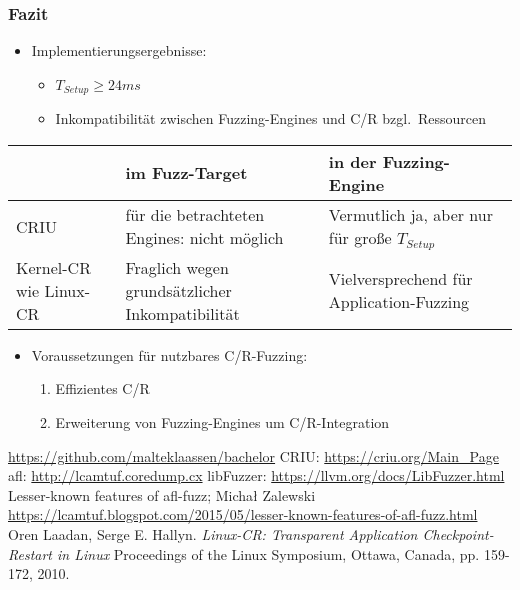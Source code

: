 \documentclass[handout]{beamer}
\begin{document}
\begin{frame}
    \frametitle{Fazit}
    \begin{itemize}
        \item Implementierungsergebnisse:
            \begin{itemize}
                \item $T_{Setup} \geq 24ms$
                \item Inkompatibilität zwischen Fuzzing-Engines und C/R bzgl.\ Ressourcen
            \end{itemize}
    \end{itemize}
    
    \vspace{\baselineskip}
    \begin{tabular}{p{2.3cm} | p{3.7cm} | p{3.9cm}}
        & im Fuzz-Target & in der Fuzzing-Engine \\
        \midrule
        CRIU & \raggedright{für die betrachteten Engines: nicht möglich} & \raggedright{Vermutlich ja, aber nur für große $T_{Setup}$} \tabularnewline
        \midrule
        Kernel-CR wie Linux-CR & \raggedright{Fraglich wegen grundsätzlicher Inkompatibilität} & \raggedright{Vielversprechend für Application-Fuzzing} \tabularnewline
    \end{tabular}

    \vspace{\baselineskip}
    \begin{itemize}
        \item Voraussetzungen für nutzbares C/R-Fuzzing:
            \begin{enumerate}
                \item Effizientes C/R
                \item Erweiterung von Fuzzing-Engines um C/R-Integration
            \end{enumerate}
    \end{itemize}
\end{frame}


\begin{frame}

\end{frame}

\begin{thebibliography}{}
        \url{https://github.com/malteklaassen/bachelor}
        CRIU: \url{https://criu.org/Main_Page}
        afl: \url{http://lcamtuf.coredump.cx}
        libFuzzer: \url{https://llvm.org/docs/LibFuzzer.html}
        Lesser-known features of afl-fuzz; Michał Zalewski \url{https://lcamtuf.blogspot.com/2015/05/lesser-known-features-of-afl-fuzz.html}
        Oren Laadan, Serge E. Hallyn.
        \textit{Linux-CR: Transparent Application Checkpoint-Restart in Linux}
        Proceedings of the Linux Symposium, Ottawa, Canada, pp. 159-172, 2010.
\end{thebibliography}
\end{document}
